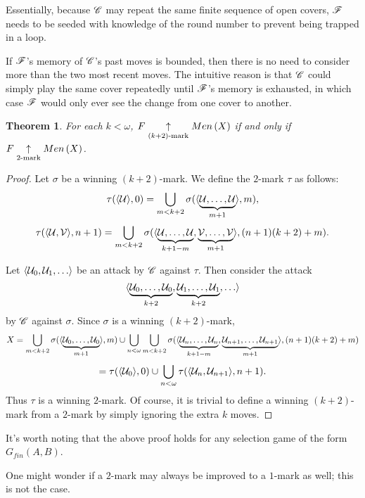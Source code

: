 \documentclass{amsart}
\newtheorem{theorem}{Theorem}[section]
\theoremstyle{definition}
\begin{document}
Essentially, because \(\mathscr{C}\) may repeat the same finite sequence of open covers,
\(\mathscr{F}\) needs to be seeded with knowledge of the round number to prevent being
trapped in a loop.

If \(\mathscr{F}\)'s memory of \(\mathscr{C}\)'s past moves is bounded, then
there is no need to consider more than the two most recent moves. The
intuitive reason is that \(\mathscr{C}\) could simply play the same cover repeatedly
until \(\mathscr{F}\)'s memory is exhausted, in which case \(\mathscr{F}\) would only ever
see the change from one cover to another.

\begin{theorem}
  For each \(k<\omega\), \(F \underset{(k+2)\text{-mark}}{\uparrow} Men\left({X}\right)\)
  if and only if \(F \underset{2\text{-mark}}{\uparrow} Men\left({X}\right)\).
\end{theorem}

\begin{proof}
  Let \(\sigma\) be a winning \((k+2)\)-mark. We define the \(2\)-mark \(\tau\) as
  follows:
    \[
      \tau(\langle\mathcal{U}\rangle,0)
        =
      \bigcup_{m<k+2}
        \sigma(\langle\underbrace{\mathcal{U},\dots,\mathcal{U}}_{m+1}\rangle,m)
    ,\]
    \[
      \tau(\langle\mathcal{U},\mathcal{V}\rangle,n+1)
        =
      \bigcup_{m<k+2}
        \sigma(\langle
          \underbrace{\mathcal{U},\dots,\mathcal{U}}_{k+1-m},
          \underbrace{\mathcal{V},\dots,\mathcal{V}}_{m+1}
        \rangle,(n+1)(k+2)+m)
    .\]

  Let \(\<\mc U_0,\mc U_1,\dots\>\) be an attack by \(\mathscr{C}\) against \(\tau\).
  Then consider the attack
    \[
      \<
        \underbrace{\mc U_0,\dots,\mc U_0}_{k+2},
        \underbrace{\mc U_1,\dots,\mc U_1}_{k+2},
        \dots
      \>
    \]
  by \(\mathscr{C}\) against \(\sigma\). Since \(\sigma\) is a winning \((k+2)\)-mark,
    \[
      X
        =
      \bigcup_{m<k+2}
        \sigma(\langle\underbrace{\mathcal{U}_0,\dots,\mathcal{U}_0}_{m+1}\rangle,m)
      \cup
      \bigcup_{n<\omega}
      \bigcup_{m<k+2}
        \sigma(\langle
          \underbrace{\mathcal{U}_n,\dots,\mathcal{U}_n}_{k+1-m},
          \underbrace{\mathcal{U}_{n+1},\dots,\mathcal{U}_{n+1}}_{m+1}
        \rangle,(n+1)(k+2)+m)
    \]
    \[
      =
      \tau(\langle\mathcal{U}_0\rangle,0)
      \cup
      \bigcup_{n<\omega}
      \tau(\langle\mathcal{U}_n,\mathcal{U}_{n+1}\rangle,n+1)
    .\]
  Thus \(\tau\) is a winning \(2\)-mark. Of course, it is trivial to
  define a winning \((k+2)\)-mark from a \(2\)-mark by simply ignoring
  the extra \(k\) moves.
\end{proof}

It's worth noting that the above proof holds for any selection game of
the form \(G_{fin}(A,B)\).

One might wonder if a \(2\)-mark may always be improved to a \(1\)-mark
as well; this is not the case.
\end{document}
